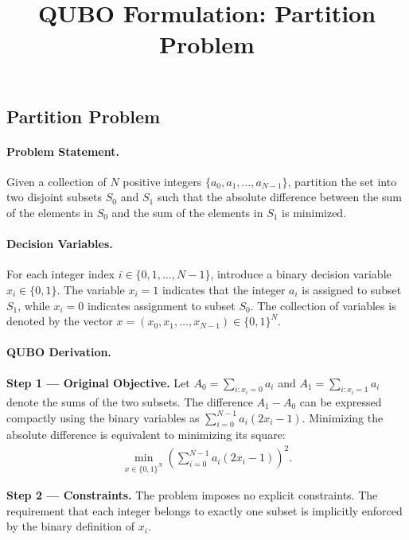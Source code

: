 \documentclass[12pt]{article}
\title{QUBO Formulation: Partition Problem}
\date{}
\begin{document}
\maketitle

\subsection*{Partition Problem}

\paragraph{Problem Statement.}
Given a collection of $N$ positive integers $\{a_0, a_1, \dots, a_{N-1}\}$, partition the set into two disjoint subsets $S_0$ and $S_1$ such that the absolute difference between the sum of the elements in $S_0$ and the sum of the elements in $S_1$ is minimized.

\paragraph{Decision Variables.}
For each integer index $i \in \{0, 1, \dots, N-1\}$, introduce a binary decision variable $x_i \in \{0, 1\}$. The variable $x_i = 1$ indicates that the integer $a_i$ is assigned to subset $S_1$, while $x_i = 0$ indicates assignment to subset $S_0$. The collection of variables is denoted by the vector $x = (x_0, x_1, \dots, x_{N-1}) \in \{0, 1\}^N$.

\paragraph{QUBO Derivation.}
\textbf{Step 1 --- Original Objective.}
Let $A_0 = \sum_{i: x_i = 0} a_i$ and $A_1 = \sum_{i: x_i = 1} a_i$ denote the sums of the two subsets. The difference $A_1 - A_0$ can be expressed compactly using the binary variables as $\sum_{i=0}^{N-1} a_i (2x_i - 1)$. Minimizing the absolute difference is equivalent to minimizing its square:
\begin{align}
    \min_{x \in \{0,1\}^N} \left( \sum_{i=0}^{N-1} a_i (2x_i - 1) \right)^2.
\end{align}

\textbf{Step 2 --- Constraints.}
The problem imposes no explicit constraints. The requirement that each integer belongs to exactly one subset is implicitly enforced by the binary definition of $x_i$.
\end{document}
